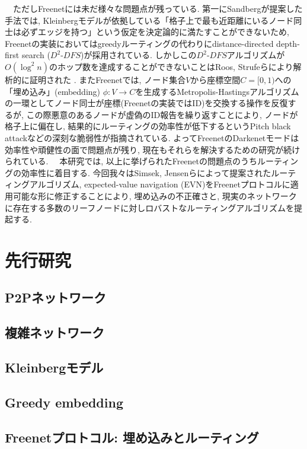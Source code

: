 \documentclass[dvipdfmx]{ampbt}
\begin{document}
\ \ ただしFreenetには未だ様々な問題点が残っている. 第一にSandbergが提案した手法では, Kleinbergモデルが依拠している「格子上で最も近距離にいるノード同士は必ずエッジを持つ」という仮定を決定論的に満たすことができないため, Freenetの実装においてはgreedyルーティングの代わりにdistance-directed depth-first search ($D^2$-$DFS$)が採用されている. しかしこの$D^2$-$DFS$アルゴリズムが$O(\log^2 n)$のホップ数を達成することができないことはRoos, Strufeらにより解析的に証明された\cite{roos2012provable} \cite{roos2016dealing}\cite{roos2016analyzing}. またFreenetでは, ノード集合$V$から座標空間$C= [0,1)$への「埋め込み」(embedding) $\phi: V \to C$を生成するMetropolis-Hastingsアルゴリズムの一環としてノード同士が座標(Freenetの実装ではID)を交換する操作を反復するが, この際悪意のあるノードが虚偽のID報告を繰り返すことにより, ノードが格子上に偏在し, 結果的にルーティングの効率性が低下するというPitch black attack\cite{evans2007routing}などの深刻な脆弱性が指摘されている. よってFreenetのDarkenetモードは効率性や頑健性の面で問題点が残り, 現在もそれらを解決するための研究が続けられている. \newline
\ \ 本研究では, 以上に挙げられたFreenetの問題点のうちルーティングの効率性に着目する. 今回我々はSimsek, Jensenらによって提案されたルーティングアルゴリズム, expected-value navigation (EVN)\cite{csimcsek2008navigating}をFreenetプロトコルに適用可能な形に修正することにより, 埋め込みの不正確さと, 現実のネットワークに存在する多数のリーフノードに対しロバストなルーティングアルゴリズムを提起する.

 \section{先行研究}
   \subsection{P2Pネットワーク}
   \subsection{複雑ネットワーク}
   \subsection{Kleinbergモデル}
   \subsection{Greedy embedding}
   \subsection{Freenetプロトコル: 埋め込みとルーティング}
\end{document}
